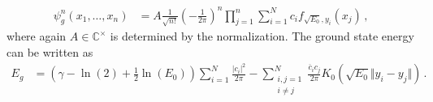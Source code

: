 \begin{align*}
  \psi_{g}^{n}(x_{1},\dots,x_{n})
  &=
  A
  \frac{1}{\sqrt{n!}}
  \left(
    -
    \frac{1}{2\pi}
  \right)^{n}
  \prod_{j = 1}^{n}
  \sum_{i = 1}^{N}
  c_{i}
  f_{\sqrt{E_{0}},y_{i}}(x_{j})
  \,,
\end{align*}
where again $A \in \mathbb{C}^{\times}$ is determined by the normalization. The ground state energy can be written as
\begin{align*}
  E_{g}
  &=
  \left(
    \gamma
    -
    \ln(2)
    +
    \frac{1}{2}
    \ln(E_{0})
  \right)
  \sum_{i = 1}^{N}
  \frac{\vert c_{i} \vert^{2}}{2\pi}
  -
  \sum_{\substack{i,j = 1 \\ i \neq j}}^{N}
  \frac{\overline{c}_{i}c_{j}}{2\pi}
  K_{0}
  \left(
    \sqrt{E_{0}}
    \Vert y_{i} - y_{j} \Vert
  \right)
  \,.
\end{align*}
